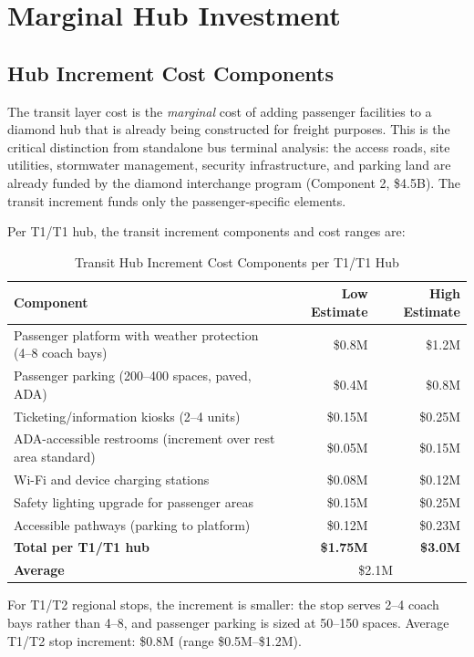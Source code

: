 \section{Marginal Hub Investment}

\subsection{Hub Increment Cost Components}

The transit layer cost is the \textit{marginal} cost of adding passenger facilities to a diamond hub that is already being constructed for freight purposes. This is the critical distinction from standalone bus terminal analysis: the access roads, site utilities, stormwater management, security infrastructure, and parking land are already funded by the diamond interchange program (Component 2, \$4.5B). The transit increment funds only the passenger-specific elements.

Per T1/T1 hub, the transit increment components and cost ranges are:

\begin{table}[h]
\centering
\caption{Transit Hub Increment Cost Components per T1/T1 Hub}
\label{tab:hubcost}
\begin{tabular}{lrr}
\toprule
Component & Low Estimate & High Estimate \\
\midrule
Passenger platform with weather protection (4--8 coach bays) & \$0.8M & \$1.2M \\
Passenger parking (200--400 spaces, paved, ADA) & \$0.4M & \$0.8M \\
Ticketing/information kiosks (2--4 units) & \$0.15M & \$0.25M \\
ADA-accessible restrooms (increment over rest area standard) & \$0.05M & \$0.15M \\
Wi-Fi and device charging stations & \$0.08M & \$0.12M \\
Safety lighting upgrade for passenger areas & \$0.15M & \$0.25M \\
Accessible pathways (parking to platform) & \$0.12M & \$0.23M \\
\midrule
\textbf{Total per T1/T1 hub} & \textbf{\$1.75M} & \textbf{\$3.0M} \\
\textbf{Average} & \multicolumn{2}{c}{\$2.1M} \\
\bottomrule
\end{tabular}
\end{table}

For T1/T2 regional stops, the increment is smaller: the stop serves 2--4 coach bays rather than 4--8, and passenger parking is sized at 50--150 spaces. Average T1/T2 stop increment: \$0.8M (range \$0.5M--\$1.2M).

